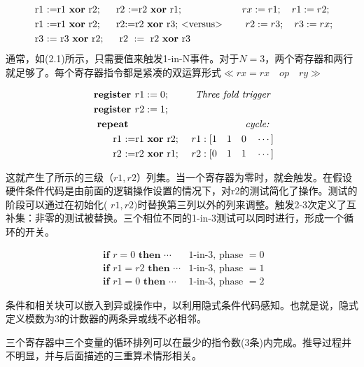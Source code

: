 \begin{CJK}{UTF8}{gbsn}
$$
\begin{aligned}
& \text { r1 :=r1  \textbf{xor} r2; } \quad \text { r2 :=r2 \textbf{xor} r1; } \quad  &rx :=r 1 ; \quad r 1:=r 2 \text {; } \\
& \text { r1 :=r1 \textbf{xor} r2; } \quad \text { r2:=r2 \textbf{xor} r3; <versus>} \quad &r2:=r 3 ; \quad r 3:=r x ; \\
& \text { r3 := r3 \textbf{xor} r2; } \quad \text { r2 }:=\text { r2 \textbf{xor} r3 }
\end{aligned}
$$
通常，如(2.1)所示，只需要值来触发1-in-N事件。对于$N=3$，两个寄存器和两行就足够了。每个寄存器指令都是紧凑的双运算形式$\ll r x=rx \quad op \quad ry \gg$


$$
\begin{aligned}
& \textbf { register } r1 :=0 ;  &\textit{Three fold trigger } \\
& \textbf { register } r2 :=1;  \\
& \text { \textbf{ repeat}}         & \textit{ cycle: }\\
&\qquad \text { r1 :=r1  \textbf{xor} r2;} &r1:[1\quad 1 \quad 0\quad \cdots] \\
&\qquad \text { r2 :=r2 \textbf{xor} r1; } &r2:[0\quad 1 \quad 1\quad \cdots] 
\end{aligned}
$$

这就产生了所示的三级（$r1,r2$）列集。当一个寄存器为零时，就会触发。在假设硬件条件代码是由前面的逻辑操作设置的情况下，对r2的测试简化了操作。测试的阶段可以通过在初始化( $r1, r2)$时替换第三列以外的列来调整。触发2-3次定义了互补集：非零的测试被替换。三个相位不同的1-in-3测试可以同时进行，形成一个循环的开关。


$$
\begin{array}{ll}
\textbf { if } r=0 \textbf { then } \cdots & 1 \text {-in-3, phase }=0 \\
\textbf { if } r1=r 2 \textbf { then } \cdots & 1 \text {-in-3, phase }=1 \\
\textbf { if } r1=0 \textbf { then } \cdots & 1 \text {-in-3, phase }=2
\end{array}
$$

条件和相关块可以嵌入到异或操作中，以利用隐式条件代码感知。也就是说，隐式定义模数为3的计数器的两条异或线不必相邻。

三个寄存器中三个变量的循环排列可以在最少的指令数(3条)内完成。推导过程并不明显，并与后面描述的三重算术情形相关。


\IncMargin{1em}
\begin{algorithm} 


\end{algorithm}
\end{CJK}
